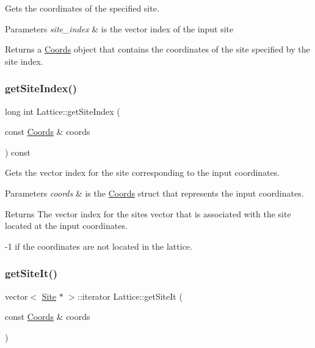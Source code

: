 Gets the coordinates of the specified site. 


\begin{DoxyParams}{Parameters}
{\em site\+\_\+index} & is the vector index of the input site \\
\hline
\end{DoxyParams}
\begin{DoxyReturn}{Returns}
a \hyperlink{struct_coords}{Coords} object that contains the coordinates of the site specified by the site index. 
\end{DoxyReturn}
\mbox{\label{class_lattice_a60431f6504a253d47acb0b02f524571c}} 
\subsubsection{\texorpdfstring{get\+Site\+Index()}{getSiteIndex()}}
{\footnotesize\ttfamily long int Lattice\+::get\+Site\+Index (\begin{DoxyParamCaption}\item[{const \hyperlink{struct_coords}{Coords} \&}]{coords }\end{DoxyParamCaption}) const}



Gets the vector index for the site corresponding to the input coordinates. 


\begin{DoxyParams}{Parameters}
{\em coords} & is the \hyperlink{struct_coords}{Coords} struct that represents the input coordinates. \\
\hline
\end{DoxyParams}
\begin{DoxyReturn}{Returns}
The vector index for the sites vector that is associated with the site located at the input coordinates. 

-\/1 if the coordinates are not located in the lattice. 
\end{DoxyReturn}
\mbox{\label{class_lattice_a46f7d12855d24e1bdd02814621b0a178}} 
\subsubsection{\texorpdfstring{get\+Site\+It()}{getSiteIt()}}
{\footnotesize\ttfamily vector$<$ \hyperlink{class_site}{Site} $\ast$ $>$\+::iterator Lattice\+::get\+Site\+It (\begin{DoxyParamCaption}\item[{const \hyperlink{struct_coords}{Coords} \&}]{coords }\end{DoxyParamCaption})}



